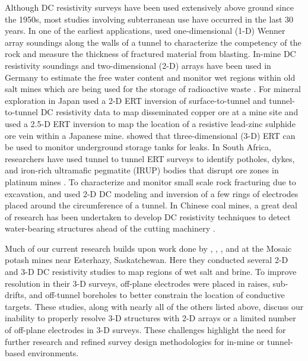 \documentclass[preprint,authoryear,12pt]{elsarticle}
\begin{document}
Although DC resistivity surveys have been used extensively above ground since the 1950s, most studies involving subterranean use have occurred in the last 30 years. In one of the earliest applications, \cite{Scott1968} used one-dimensional (1-D) Wenner array soundings along the walls of a tunnel to characterize the competency of the rock and measure the thickness of fractured material from blasting. In-mine DC resistivity soundings and two-dimensional (2-D) arrays have been used in Germany to estimate the free water content and monitor wet regions within old salt mines which are being used for the storage of radioactive waste \citep{Kessels1985,Yaramanci2000}. For mineral exploration in Japan \cite{Sasaki1990} used a 2-D ERT inversion of surface-to-tunnel and tunnel-to-tunnel DC resistivity data to map disseminated copper ore at a mine site and \cite{Arai1995} used a 2.5-D ERT inversion to map the location of a resistive lead-zinc sulphide ore vein within a Japanese mine. \cite{Ramirez1996} showed that three-dimensional (3-D) ERT can be used to monitor underground storage tanks for leaks. In South Africa, researchers have used tunnel to tunnel ERT surveys to identify potholes, dykes, and iron-rich ultramafic pegmatite (IRUP) bodies that disrupt ore zones in platinum mines \citep{Schoor2005,VanSchoor2010}. To characterize and monitor small scale rock fracturing due to excavation, \cite{Kruschwitz2004} and \cite{Gibert2006} used 2-D DC modeling and inversion of a few rings of electrodes placed around the circumference of a tunnel. In Chinese coal mines, a great deal of research has been undertaken to develop DC resistivity techniques to detect water-bearing structures ahead of the cutting machinery \citep{Wang2011,Han2011}.

Much of our current research builds upon work done by \cite{Maxwell2005}, \cite{Eso2006a,Eso2006b,Eso2006}, \cite{Cisyk2014}, \cite{Maxwell2016} and \cite{Mitchell2016a,Mitchell2016} at the Mosaic potash mines near Esterhazy, Saskatchewan. Here they conducted several 2-D and 3-D DC resistivity studies to map regions of wet salt and brine. To improve resolution in their 3-D surveys, off-plane electrodes were placed in raises, sub-drifts, and off-tunnel boreholes to better constrain the location of conductive targets. These studies, along with nearly all of the others listed above, discuss our inability to properly resolve 3-D structures with 2-D arrays or a limited number of off-plane electrodes in 3-D surveys. These challenges highlight the need for further research and refined survey design methodologies for in-mine or tunnel-based environments.
\end{document}
